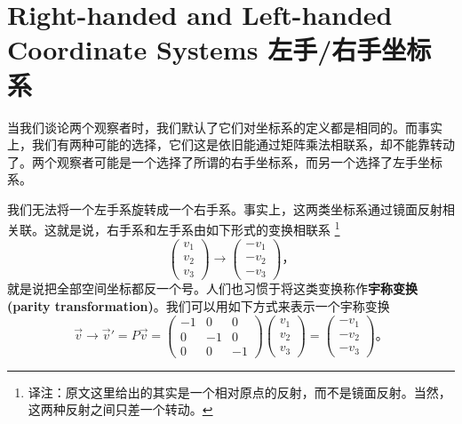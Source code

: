 \section[左手/右手坐标系]{Right-handed and Left-handed Coordinate Systems 左手/右手坐标系}\label{appendix.A.5}
当我们谈论两个观察者时，我们默认了它们对坐标系的定义都是相同的。而事实上，我们有两种可能的选择，它们这是依旧能通过矩阵乘法相联系，却不能靠转动了。两个观察者可能是一个选择了所谓的右手坐标系，而另一个选择了左手坐标系。


我们无法将一个左手系旋转成一个右手系。事实上，这两类坐标系通过镜面反射相关联。这就是说，右手系和左手系由如下形式的变换相联系%
\footnote{译注：原文这里给出的其实是一个相对原点的反射，而不是镜面反射。当然，这两种反射之间只差一个转动。}
\begin{equation}
\begin{pmatrix}
v_1 \\ v_2 \\ v_3
\end{pmatrix} \rightarrow
\begin{pmatrix}
-v_1 \\ -v_2 \\ -v_3
\end{pmatrix}\text{，}
\end{equation}
就是说把全部空间坐标都反一个号。人们也习惯于将这类变换称作{\bf 宇称变换(parity transformation)}。我们可以用如下方式来表示一个宇称变换
\begin{equation}
\vec{v} \rightarrow \vec{v}' = P\vec{v} = \begin{pmatrix}
-1 & 0 & 0 \\ 0 & -1 & 0 \\ 0 & 0 & -1
\end{pmatrix}
\begin{pmatrix}
v_1 \\ v_2 \\ v_3
\end{pmatrix} =
\begin{pmatrix}
-v_1 \\ -v_2 \\ -v_3
\end{pmatrix}\text{。}
\end{equation}

